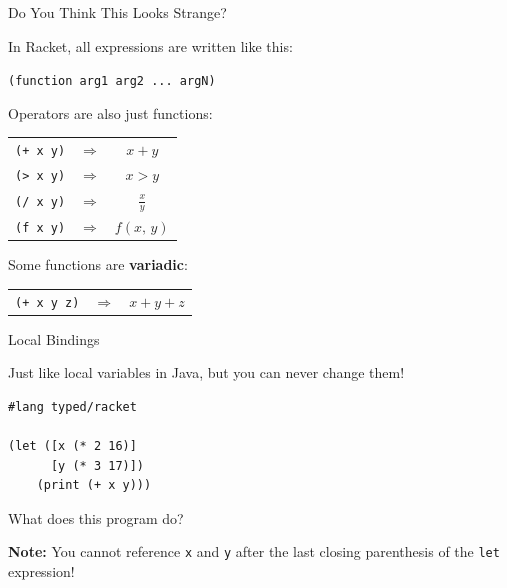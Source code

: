 \documentclass{beamer}
\begin{document}
\begin{frame}[fragile]{Do You Think This Looks Strange?}

  In Racket, all expressions are written like this:

  \begin{center}
    \lstinline{(function arg1 arg2 ... argN)}
  \end{center}

  \pause{}

  Operators are also just functions:

  \begin{center}
    \begin{tabular}{ccc}
      \lstinline{(+ x y)} & $\Rightarrow$ & $x + y$ \\
      \lstinline{(> x y)} & $\Rightarrow$ & $x > y$ \\
      \lstinline{(/ x y)} & $\Rightarrow$ & $\frac{x}{y}$ \\
      \lstinline{(f x y)} & $\Rightarrow$ & $f(x, \, y)$
    \end{tabular}
  \end{center}

  \pause{}

  Some functions are \textbf{variadic}:

  \begin{center}
    \begin{tabular}{ccc}
      \lstinline{(+ x y z)} & $\Rightarrow$ & $x + y + z$
    \end{tabular}
  \end{center}

\end{frame}

\begin{frame}[fragile]{Local Bindings}

Just like local variables in Java, but you can never change them!

\begin{lstlisting}
#lang typed/racket

(let ([x (* 2 16)]
      [y (* 3 17)])
    (print (+ x y)))
\end{lstlisting}

What does this program do?

\vspace{1cm}

\textbf{Note:} You cannot reference \lstinline{x} and \lstinline{y} after the last closing parenthesis of the \lstinline{let} expression!

\end{frame}
\end{document}
